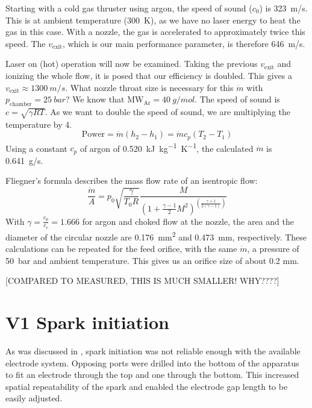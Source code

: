             Starting with a cold gas thruster using argon, the speed of sound ($c_0$) is \qty{323}{m/s}. This is at ambient temperature (\qty{300}{K}), as we have no laser energy to heat the gas in this case. With a nozzle, the gas is accelerated to approximately twice this speed. The $v_\mathrm{exit}$, which is our main performance parameter, is therefore \qty{646}{m/s}.
            
            Laser on (hot) operation will now be examined. Taking the previous $v_\mathrm{exit}$ and ionizing the whole flow, it is posed that our efficiency is doubled. This gives a $v_\mathrm{exit}\approx \qty{1300}{m/s}$. What nozzle throat size is necessary for this $\dot m$ with $p_\mathrm{chamber} = \qty{25}{bar}$? We know that $\mathrm{MW_{Ar}} = \qty{40}{g/mol}$. The speed of sound is $c = \sqrt{\gamma R T}$. As we want to double the speed of sound, we are multiplying the temperature by 4.
            \[\text{Power} = \dot m (h_2-h_1)
            = \dot m c_p (T_2-T_1)\]
            Using a constant $c_p$ of argon of \qty{0.520}{kJ.kg^{-1}.K^{-1}}, the calculated $\dot m$ is \qty{0.641}{g/s}.
            
            Fliegner's formula describes the mass flow rate of an isentropic flow:
            \[\frac{\dot m}{A} = p_0\sqrt{\frac{\gamma}{T_0 R}}\frac{M}{(1+\frac{\gamma-1}{2}M^2)^{(\frac{\gamma+1}{2(\gamma-1)})}}\]
            With $\gamma = \frac{c_p}{c_v} = 1.666$ for argon and choked flow at the nozzle, the area and the diameter of the circular nozzle are \qty{0.176}{mm^2} and \qty{0.473}{mm}, respectively. These calculations can be repeated for the feed orifice, with the same $\dot m$, a pressure of \qty{50}{bar} and ambient temperature. This gives us an orifice size of about 0.2 mm.

            [COMPARED TO MEASURED, THIS IS MUCH SMALLER! WHY????]

        
        \section{V1 Spark initiation}
            
            As was discussed in \textcite{duplayArgonLaserPlasmaThruster2024a}, spark initiation was not reliable enough with the available electrode system. Opposing ports were drilled into the bottom of the apparatus to fit an electrode through the top and one through the bottom. This increased spatial repeatability of the spark and enabled the electrode gap length to be easily adjusted.

